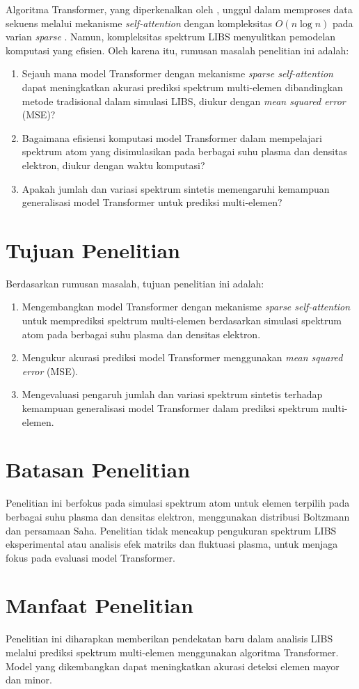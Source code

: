 Algoritma Transformer, yang diperkenalkan oleh \cite{vaswani-2017}, unggul dalam memproses data sekuens melalui mekanisme \textit{self-attention} dengan kompleksitas \( O(n \log n) \) pada varian \textit{sparse} \parencite{gao2024}. Namun, kompleksitas spektrum LIBS menyulitkan pemodelan komputasi yang efisien. Oleh karena itu, rumusan masalah penelitian ini adalah:
\begin{enumerate}
    \item Sejauh mana model Transformer dengan mekanisme \textit{sparse self-attention} dapat meningkatkan akurasi prediksi spektrum multi-elemen dibandingkan metode tradisional dalam simulasi LIBS, diukur dengan \textit{mean squared error} (MSE)?
    \item Bagaimana efisiensi komputasi model Transformer dalam mempelajari spektrum atom yang disimulasikan pada berbagai suhu plasma dan densitas elektron, diukur dengan waktu komputasi?
    \item Apakah jumlah dan variasi spektrum sintetis memengaruhi kemampuan generalisasi model Transformer untuk prediksi multi-elemen?
\end{enumerate}


\section{Tujuan Penelitian}
Berdasarkan rumusan masalah, tujuan penelitian ini adalah:
\begin{enumerate}

    \item Mengembangkan model Transformer dengan mekanisme \textit{sparse self-attention} untuk memprediksi spektrum multi-elemen berdasarkan simulasi spektrum atom pada berbagai suhu plasma dan densitas elektron.
    \item Mengukur akurasi prediksi model Transformer menggunakan \textit{mean squared error} (MSE).
    \item Mengevaluasi pengaruh jumlah dan variasi spektrum sintetis terhadap kemampuan generalisasi model Transformer dalam prediksi spektrum multi-elemen.
\end{enumerate}
\section{Batasan Penelitian}
Penelitian ini berfokus pada simulasi spektrum atom untuk elemen terpilih pada berbagai suhu plasma dan densitas elektron, menggunakan distribusi Boltzmann dan persamaan Saha. Penelitian tidak mencakup pengukuran spektrum LIBS eksperimental atau analisis efek matriks dan fluktuasi plasma, untuk menjaga fokus pada evaluasi model Transformer.

\section{Manfaat Penelitian}
Penelitian ini diharapkan memberikan pendekatan baru dalam analisis LIBS melalui prediksi spektrum multi-elemen menggunakan algoritma Transformer. Model yang dikembangkan dapat meningkatkan akurasi deteksi elemen mayor dan minor.
